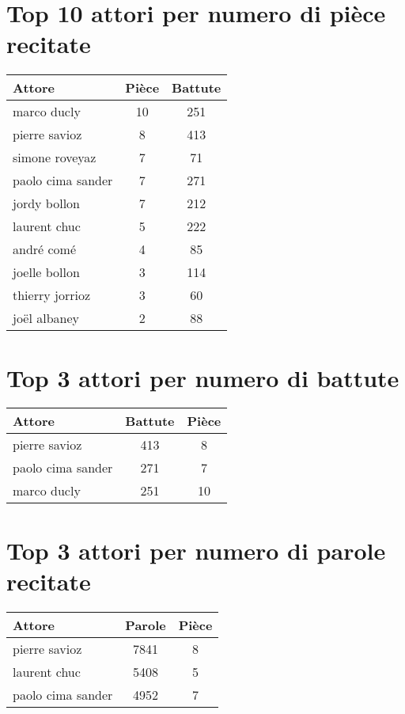 \section*{Top 10 attori per numero di pièce recitate}
\begin{tabular}{lcc}
\toprule
Attore & Pièce & Battute \\
\midrule
marco ducly & 10 & 251 \\
pierre savioz & 8 & 413 \\
simone roveyaz & 7 & 71 \\
paolo cima sander & 7 & 271 \\
jordy bollon & 7 & 212 \\
laurent chuc & 5 & 222 \\
andré comé & 4 & 85 \\
joelle bollon & 3 & 114 \\
thierry jorrioz & 3 & 60 \\
joël albaney & 2 & 88 \\
\bottomrule
\end{tabular}

\section*{Top 3 attori per numero di battute}
\begin{tabular}{lcc}
\toprule
Attore & Battute & Pièce \\
\midrule
pierre savioz & 413 & 8 \\
paolo cima sander & 271 & 7 \\
marco ducly & 251 & 10 \\
\bottomrule
\end{tabular}

\section*{Top 3 attori per numero di parole recitate}
\begin{tabular}{lcc}
\toprule
Attore & Parole & Pièce \\
\midrule
pierre savioz & 7841 & 8 \\
laurent chuc & 5408 & 5 \\
paolo cima sander & 4952 & 7 \\
\bottomrule
\end{tabular}
